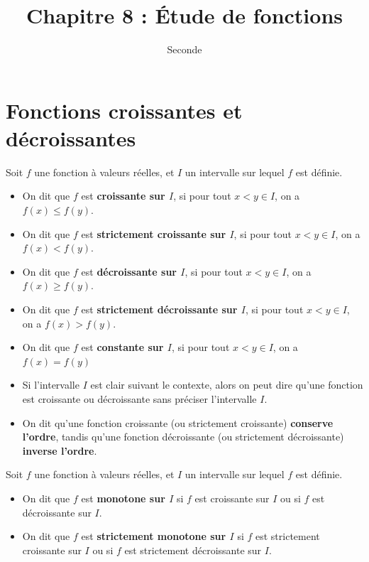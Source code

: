 \documentclass{poly}
\title{Chapitre 8 : Étude de fonctions}
\author{Seconde}
\date{}
\begin{document}
\maketitle
\section{Fonctions croissantes et décroissantes}
\begin{definition}
Soit $f$ une fonction à valeurs réelles, et $I$ un intervalle sur lequel $f$ est définie.
\begin{itemize}
\item On dit que $f$ est \textbf{croissante sur $I$}, si pour tout $x < y \in I$, on a $f(x) \leq f(y)$.  
\item On dit que $f$ est \textbf{strictement croissante sur $I$}, si pour tout $x < y \in I$, on a $f(x) < f(y)$.  
\item On dit que $f$ est \textbf{décroissante sur $I$}, si pour tout $x < y \in I$, on a $f(x) \geq f(y)$.  
\item On dit que $f$ est \textbf{strictement décroissante sur $I$}, si pour tout $x < y \in I$, on a $f(x) > f(y)$.
\item On dit que $f$ est \textbf{constante sur $I$}, si pour tout $x < y \in I$, on a $f(x) = f(y)$
\end{itemize}
\end{definition}
\begin{remark}
\hfill
\begin{itemize}
\item Si l'intervalle $I$ est clair suivant le contexte, alors on peut dire qu'une fonction est croissante ou décroissante sans préciser l'intervalle $I$.
\item On dit qu'une fonction croissante (ou strictement croissante) \textbf{conserve l'ordre}, tandis qu'une fonction décroissante (ou strictement décroissante) \textbf{inverse l'ordre}.
\end{itemize}
\end{remark}
\begin{definition}
Soit $f$ une fonction à valeurs réelles, et $I$ un intervalle sur lequel $f$ est définie. 
\begin{itemize}
\item On dit que $f$ est \textbf{monotone sur $I$} si $f$ est croissante sur $I$ ou si $f$ est décroissante sur $I$.
\item On dit que $f$ est \textbf{strictement monotone sur $I$} si $f$ est strictement croissante sur $I$ ou si $f$ est strictement décroissante sur $I$.
\end{itemize}
\end{definition}
\end{document}

